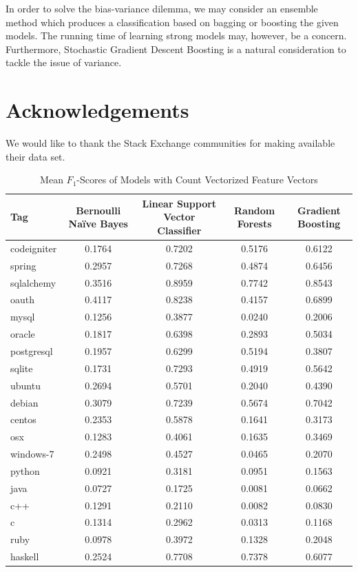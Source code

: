 \documentclass{sig-alternate}
\begin{document}
	In order to solve the bias-variance dilemma, we may consider an ensemble
	method which produces a classification based on bagging or boosting the
	given models. The running time of learning strong models may, however, be a
	concern. Furthermore, Stochastic Gradient Descent Boosting is a natural
	consideration to tackle the issue of variance.

\section{Acknowledgements} %
\label{sec:Acknowledgements}

We would like to thank the Stack Exchange communities for making available
their data set.





\begin{table}[ht!]
	\centering
	\begin{tabular}{|l|c|c|c|c|}
		\hline
		\textbf{Tag} & \textbf{Bernoulli Na\"{i}ve Bayes} & \textbf{Linear Support Vector Classifier} & \textbf{Random Forests} & \textbf{Gradient Boosting} \\\hline
		codeigniter	& 0.1764	& 0.7202	& 0.5176	& 0.6122 \\\hline
		spring		& 0.2957	& 0.7268	& 0.4874	& 0.6456 \\\hline
		sqlalchemy	& 0.3516	& 0.8959	& 0.7742	& 0.8543 \\\hline
		oauth		& 0.4117	& 0.8238	& 0.4157	& 0.6899 \\\hline
		mysql		& 0.1256	& 0.3877	& 0.0240	& 0.2006 \\\hline
		oracle		& 0.1817	& 0.6398	& 0.2893	& 0.5034 \\\hline
		postgresql	& 0.1957	& 0.6299	& 0.5194	& 0.3807 \\\hline
		sqlite		& 0.1731	& 0.7293	& 0.4919	& 0.5642 \\\hline
		ubuntu		& 0.2694	& 0.5701	& 0.2040	& 0.4390 \\\hline
		debian		& 0.3079	& 0.7239	& 0.5674	& 0.7042 \\\hline
		centos		& 0.2353	& 0.5878	& 0.1641	& 0.3173 \\\hline
		osx			& 0.1283	& 0.4061	& 0.1635	& 0.3469 \\\hline
		windows-7	& 0.2498	& 0.4527	& 0.0465	& 0.2070 \\\hline
		python		& 0.0921	& 0.3181	& 0.0951	& 0.1563 \\\hline
		java		& 0.0727	& 0.1725	& 0.0081	& 0.0662 \\\hline
		c++			& 0.1291	& 0.2110	& 0.0082	& 0.0830 \\\hline
		c			& 0.1314	& 0.2962	& 0.0313	& 0.1168 \\\hline
		ruby		& 0.0978	& 0.3972	& 0.1328	& 0.2048 \\\hline
		haskell		& 0.2524	& 0.7708	& 0.7378	& 0.6077 \\\hline
	\end{tabular}
	\caption{Mean $F_1$-Scores of Models with Count Vectorized Feature Vectors}
	\label{tab:count_model_scores}
\end{table}
\end{document}
